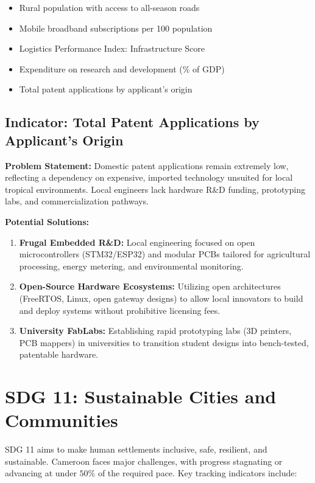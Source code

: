 \documentclass[11pt, a4paper]{article}
\begin{document}
\begin{itemize}
  \itemsep 0em
  \item Rural population with access to all-season roads
  \item Mobile broadband subscriptions per 100 population
  \item Logistics Performance Index: Infrastructure Score
  \item Expenditure on research and development (\% of GDP)
  \item Total patent applications by applicant's origin
\end{itemize}

\subsection{Indicator: Total Patent Applications by Applicant's Origin}

\textbf{Problem Statement:} Domestic patent applications remain extremely low, reflecting a dependency on expensive, imported technology unsuited for local tropical environments. Local engineers lack hardware R\&D funding, prototyping labs, and commercialization pathways.

\textbf{Potential Solutions:}
\begin{enumerate}
  \itemsep 0em
  \item \textbf{Frugal Embedded R\&D:} Local engineering focused on open microcontrollers (STM32/ESP32) and modular PCBs tailored for agricultural processing, energy metering, and environmental monitoring.
  \item \textbf{Open-Source Hardware Ecosystems:} Utilizing open architectures (FreeRTOS, Linux, open gateway designs) to allow local innovators to build and deploy systems without prohibitive licensing fees.
  \item \textbf{University FabLabs:} Establishing rapid prototyping labs (3D printers, PCB mappers) in universities to transition student designs into bench-tested, patentable hardware.
\end{enumerate}

\section{SDG 11: Sustainable Cities and Communities}
SDG 11 aims to make human settlements inclusive, safe, resilient, and sustainable. Cameroon faces major challenges, with progress stagnating or advancing at under $50\%$ of the required pace. Key tracking indicators include:
\end{document}
